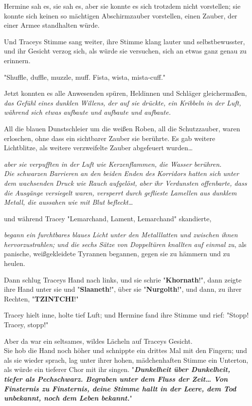 {Hermine sah es, sie sah es, aber sie konnte es sich trotzdem nicht vorstellen; sie konnte sich keinen so mächtigen Abschirmzauber vorstellen, einen Zauber, der einer Armee standhalten würde.

Und Traceys Stimme sang weiter, ihre Stimme klang lauter und selbstbewusster, und ihr Gesicht verzog sich, als würde sie versuchen, sich an etwas ganz genau zu erinnern.

"Shuffle, duffle, muzzle, muff. Fista, wista, mista-cuff."

Jetzt konnten es alle Anwesenden spüren, Heldinnen und Schläger gleichermaßen, \emph{das Gefühl eines dunklen Willens, der auf sie drückte, ein Kribbeln in der Luft, während sich etwas aufbaute und aufbaute und aufbaute.}

All die blauen Dunstschleier um die weißen Roben, all die Schutzzauber, waren erloschen, ohne dass ein sichtbarer Zauber sie berührte. Es gab weitere Lichtblitze, als weitere verzweifelte Zauber abgefeuert wurden…

\emph{aber sie verpufften in der Luft wie Kerzenflammen, die Wasser berühren.}\\ \emph{Die schwarzen Barrieren an den beiden Enden des Korridors hatten sich unter dem wachsenden Druck wie Rauch aufgelöst, aber ihr Verdunsten offenbarte, dass die} \emph{Ausgänge versiegelt waren, versperrt durch geflieste Lamellen aus dunklem Metall, die aussahen wie mit Blut befleckt…}

und während Tracey "Lemarchand, Lament, Lemarchand" skandierte,

\emph{begann ein furchtbares blaues Licht unter den Metalllatten und zwischen ihnen hervorzustrahlen; und die sechs Sätze von Doppeltüren knallten auf einmal zu}, als panische, weißgekleidete Tyrannen begannen, gegen sie zu hämmern und zu heulen.

Dann schlug Traceys Hand nach links, und sie schrie "\textbf{Khornath}!", dann zeigte ihre Hand unter sie und "\textbf{Slaaneth}!", über sie "\textbf{Nurgolth}!", und dann, zu ihrer Rechten, "\textbf{TZINTCHI}!"

Tracey hielt inne, holte tief Luft; und Hermine fand ihre Stimme und rief: "Stopp! Tracey, stopp!"

Aber da war ein seltsames, wildes Lächeln auf Traceys Gesicht.\\ Sie hob die Hand noch höher und schnippte ein drittes Mal mit den Fingern; und als sie wieder sprach, lag unter ihrer hohen, mädchenhaften Stimme ein Unterton, als würde ein tieferer Chor mit ihr singen. "\textbf{\emph{Dunkelheit über Dunkelheit, tiefer als Pechschwarz. Begraben unter dem Fluss der Zeit… Von Finsternis zu Finsternis, deine Stimme hallt in der Leere, dem Tod unbekannt, noch dem Leben bekannt.}}"

}
